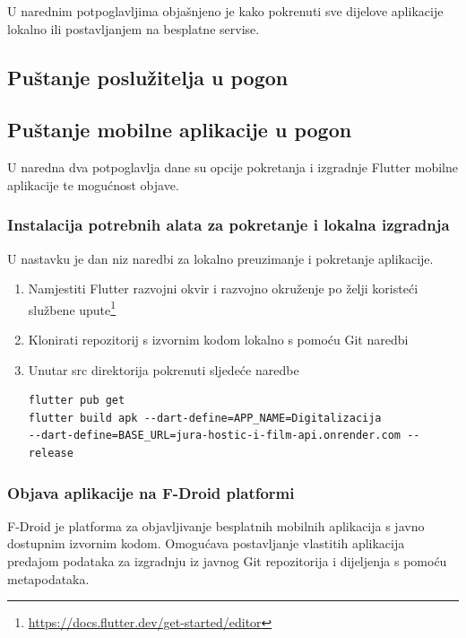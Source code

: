 			{U narednim potpoglavljima objašnjeno je kako pokrenuti sve dijelove aplikacije lokalno ili postavljanjem na besplatne servise.}
		
			\subsection{Puštanje poslužitelja u pogon}
			\subsection{Puštanje mobilne aplikacije u pogon}
			
			{U naredna dva potpoglavlja dane su opcije pokretanja i izgradnje Flutter mobilne aplikacije te mogućnost objave.}
			
			\subsubsection{Instalacija potrebnih alata za pokretanje i lokalna izgradnja}
			
			{U nastavku je dan niz naredbi za lokalno preuzimanje i pokretanje aplikacije.}
			\begin{enumerate}
			\item{Namjestiti Flutter razvojni okvir i razvojno okruženje po želji koristeći službene upute\footnote{\url{https://docs.flutter.dev/get-started/editor}}}
			\item{Klonirati repozitorij s izvornim kodom lokalno s pomoću Git naredbi}
			\item{Unutar src direktorija pokrenuti sljedeće naredbe}
			\begin{verbatim}
flutter pub get
flutter build apk --dart-define=APP_NAME=Digitalizacija 
--dart-define=BASE_URL=jura-hostic-i-film-api.onrender.com --release
			\end{verbatim}
			\end{enumerate}
			
			\subsubsection{Objava aplikacije na F-Droid platformi}
			
			{F-Droid je platforma za objavljivanje besplatnih mobilnih aplikacija s javno dostupnim izvornim kodom. Omogućava postavljanje vlastitih aplikacija predajom podataka za izgradnju iz javnog Git repozitorija i dijeljenja s pomoću metapodataka.}
			
